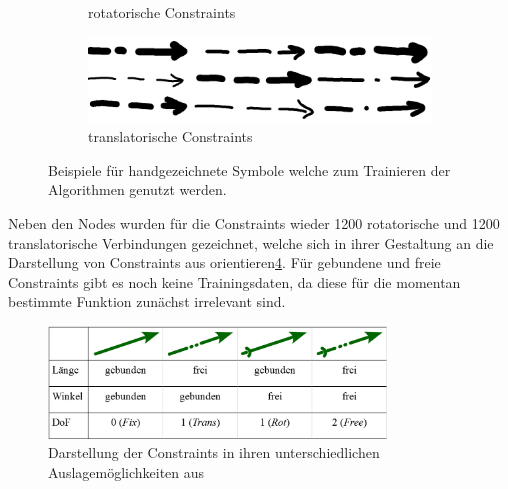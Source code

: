 \begin{figure}
\begin{subfigure}[b]{0.4\textwidth}
      \caption{rotatorische Constraints}
      \label{fig:rs}
    \end{subfigure}
    \begin{subfigure}[b]{0.4\textwidth}
      \includegraphics[width=\textwidth]{images/ts.png}
      \caption{translatorische Constraints}
      \label{fig:ts}
    \end{subfigure}
    \caption{Beispiele für handgezeichnete Symbole welche zum Trainieren der Algorithmen genutzt werden.}
    \label{fig:example_symbols}
\end{figure}

Neben den Nodes wurden für die Constraints wieder 1200 rotatorische und 1200 translatorische Verbindungen gezeichnet, welche sich in ihrer Gestaltung an die Darstellung von Constraints aus \cite{Goessner2019a} orientieren\ref{fig:constraints_gtk}.
Für gebundene und freie Constraints gibt es noch keine Trainingsdaten, da diese für die momentan bestimmte Funktion zunächst irrelevant sind.

\begin{figure}
  \centering
  \includegraphics[width=0.8\textwidth]{images/gtk2019_tab1.png}
  \caption{Darstellung der Constraints in ihren unterschiedlichen Auslagemöglichkeiten aus \cite{Goessner2019a}}
  \label{fig:constraints_gtk}
\end{figure}
